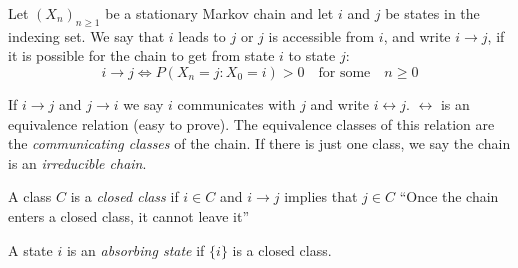 \documentclass[12pt]{article}
\begin{document}
Let $(X_n)_{n\ge 1}$ be a stationary Markov chain and let $i$ and $j$ be states in the indexing set. We say that $i$ leads to $j$ or $j$ is accessible from $i$, and write $i\to j$, if it is possible for the chain to get from state $i$ to state $j$:
\[i\to j \iff P(X_n = j : X_0 = i) > 0 \quad \textrm{for some} \quad n\ge 0 \]

If $i\to j$ and $j\to i$ we say $i$ communicates with $j$ and write $i\leftrightarrow j$. $\leftrightarrow$ is an equivalence relation (easy to prove).  The equivalence classes of this relation are the \emph{communicating classes} of the chain. If there is just one class, we say the chain is an \emph{irreducible chain}.

A class $C$ is a \emph{closed class} if $i\in C$ and $i\to j$ implies that $j\in C$ ``Once the chain enters a closed class, it cannot leave it''

A state $i$ is an \emph{absorbing state} if $\{i\}$ is a closed class.
\end{document}
